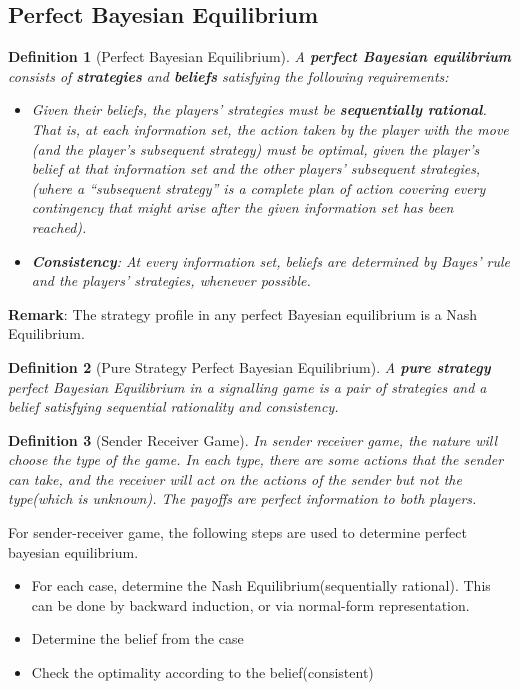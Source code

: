 \documentclass[12pt]{article}
\newtheorem{definition}{Definition}[section]
\theoremstyle{definition}
\begin{document}
\subsection{Perfect Bayesian Equilibrium}
\begin{definition}[Perfect Bayesian Equilibrium]
\normalfont A \textbf{perfect Bayesian equilibrium} consists of \textbf{strategies} \textit{and} \textbf{beliefs} satisfying the following requirements:
\begin{itemize}
  \item Given their beliefs, the players' strategies must be \textbf{sequentially rational}. \\That is, at each information set, the action taken by the player with the move (and the player's subsequent strategy) must be optimal, given the player's belief at that information set and the other players' subsequent strategies, (where a ``subsequent strategy'' is a complete plan of action covering every contingency that might arise after the given information set has been reached).
  \item \textbf{Consistency}: At every information set, beliefs are determined by Bayes' rule and the players' strategies, whenever possible.
\end{itemize}
\end{definition}
\textbf{Remark}: The strategy profile in any perfect Bayesian equilibrium is a Nash Equilibrium.
\begin{definition}[Pure Strategy Perfect Bayesian Equilibrium]
\normalfont A \textbf{pure strategy} perfect Bayesian Equilibrium in a signalling game is a pair of strategies and a belief satisfying sequential rationality and consistency.
\end{definition}
\begin{definition}[Sender Receiver Game]
\normalfont In sender receiver game, the nature will choose the type of the game. In each type, there are some actions that the sender can take, and the receiver will act on the actions of the sender but not the type(which is unknown). The payoffs are perfect information to both players.
\end{definition}
For sender-receiver game, the following steps are used to determine perfect bayesian equilibrium.
\begin{itemize}
  \item For each case, determine the Nash Equilibrium(sequentially rational). This can be done by backward induction, or via normal-form representation.
  \item Determine the belief from the case
  \item Check the optimality according to the belief(consistent)
\end{itemize}
\end{document}
